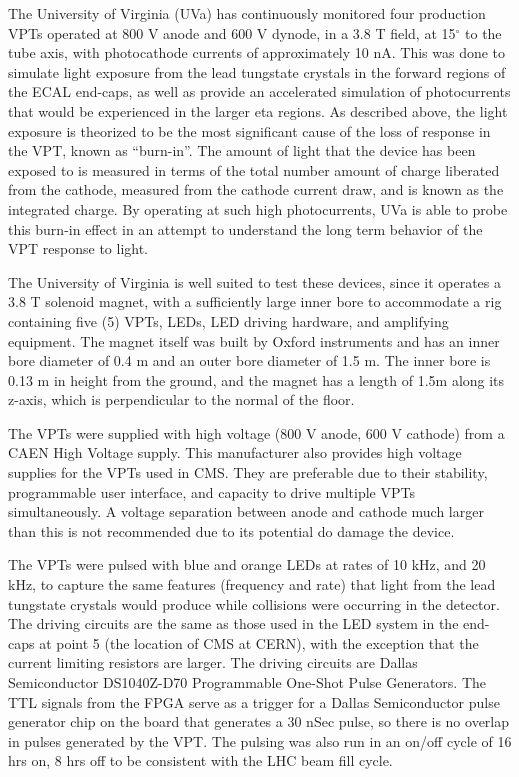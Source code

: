 \par The University of Virginia (UVa) has continuously monitored four
production VPTs operated at 800 V anode and 600 V dynode, in a 3.8 T
field, at 15$^\circ$ to the tube axis, with photocathode currents of
approximately 10 nA.  This was done to simulate light exposure from
the lead tungstate crystals in the forward regions of the ECAL
end-caps, as well as provide an accelerated simulation of
photocurrents that would be experienced in the larger eta regions.  As
described above, the light exposure is theorized
to be the most significant cause of the loss of response in the VPT,
known as “burn-in”.  The amount of light that the device has been
exposed to is measured in terms of the total number amount of charge
liberated from the cathode, measured from the cathode current draw,
and is known as the integrated charge.  By operating at such high
photocurrents, UVa is able to probe this burn-in effect in an attempt
to understand the long term behavior of the VPT response to light.  

\par The University of Virginia is well suited to test these devices,
since it operates a 3.8 T solenoid magnet, with a sufficiently large
inner bore to accommodate a rig containing five (5) VPTs, LEDs, LED
driving hardware, and amplifying equipment.  The magnet itself was
built by Oxford instruments and has an inner bore diameter of 0.4 m
and an outer bore diameter of 1.5 m.  The inner bore is 0.13 m in
height from the ground, and the magnet has a length of 1.5m along its
z-axis, which is perpendicular to the normal of the floor. 

\par The VPTs were supplied with high voltage (800 V anode, 600 V
cathode) from a CAEN High Voltage supply.  This manufacturer also
provides high voltage supplies for the VPTs used in CMS.  They are
preferable due to their stability, programmable user interface, and
capacity to drive multiple VPTs simultaneously.  A voltage separation
between anode and cathode much larger than this is not recommended due
to its potential do damage the device.  

\par The VPTs were pulsed with blue and orange LEDs at rates of 10
kHz, and 20 kHz, to capture the same features (frequency and rate)
that light from the lead tungstate crystals would produce while
collisions were occurring in the detector.  The driving circuits are
the same as those used in the LED system in the end-caps at point 5
(the location of CMS at CERN), with the exception that the current
limiting resistors are larger.  The driving circuits are Dallas Semiconductor
DS1040Z-D70 Programmable One-Shot Pulse Generators.  The TTL signals
from the FPGA serve as a trigger for a Dallas Semiconductor pulse
generator chip on the board that generates a 30 nSec pulse, so there
is no overlap in pulses generated by the VPT.  The pulsing was also
run in an on/off cycle of 16 hrs on, 8 hrs off to be consistent with
the LHC beam fill cycle.   

